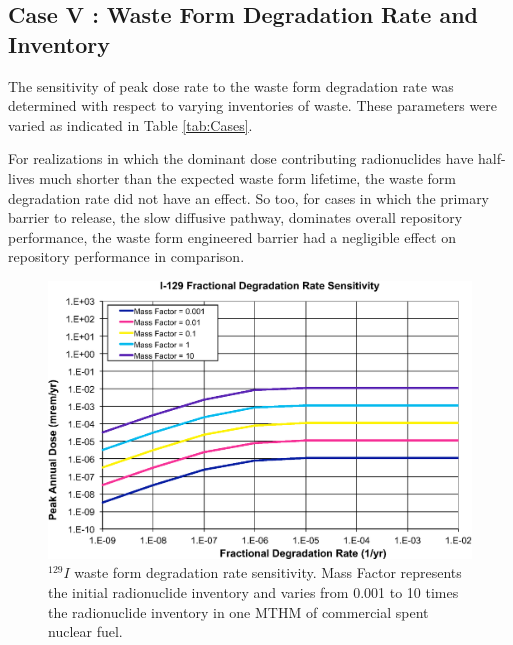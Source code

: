 
\subsection{Case V : Waste Form Degradation Rate and Inventory}

The sensitivity of peak dose rate to the waste form degradation rate was 
determined with respect to varying inventories of waste. These parameters were 
varied as indicated in Table \ref{tab:Cases}.

For realizations in which the dominant dose contributing 
radionuclides have half-lives much shorter than the expected waste form lifetime, 
the waste form degradation rate did not have an effect. So too, for 
cases in which the primary barrier to release, the slow diffusive pathway, 
dominates overall repository performance, the waste form engineered barrier
had a negligible effect on repository performance in comparison.

\begin{figure}[H]
  \centering
  \includegraphics[width=\linewidth]{I129_deg_rate.eps}
  \caption{$^{129}I$ waste form degradation rate sensitivity. Mass Factor 
represents the initial radionuclide inventory and varies from 0.001 to 10 times 
the radionuclide inventory in one \gls{MTHM} of commercial spent nuclear fuel.}
  \label{fig:WFDegI129}
\end{figure}

